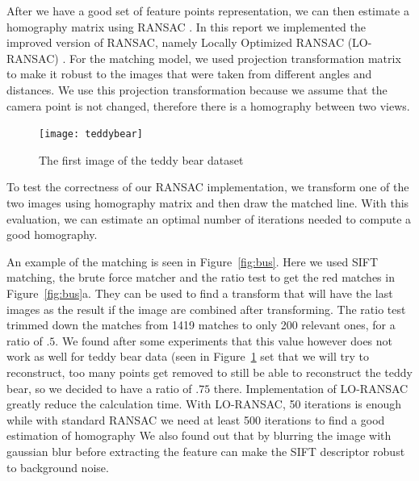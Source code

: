 After we have a good set of feature points representation, we can then estimate a homography matrix using RANSAC \cite{RANSAC}. 
In this report we implemented the improved version of RANSAC, namely Locally Optimized RANSAC (LO-RANSAC) \cite{LORANSAC}.
For the matching model, we used projection transformation matrix to make it robust to the images that were taken from different angles and distances.
We use this projection transformation because we assume that the camera point is not changed, therefore there is a homography between two views.

\begin{figure}[ht]
	\centering
	\texttt{[image: teddybear]}
	\caption{The first image of the teddy bear dataset}
	\label{fig:bear}
\end{figure}

To test the correctness of our RANSAC implementation, we transform one of the two images using homography matrix and then draw the matched line.
With this evaluation, we can estimate an optimal number of iterations needed to compute a good homography.


An example of the matching is seen in Figure~\ref{fig:bus}. 
Here we used SIFT matching, the brute force matcher and the ratio test to get the red matches in Figure~\ref{fig:bus}a. 
They can be used to find a transform that will have the last images as the result if the image are combined after transforming.
The ratio test trimmed down the matches from 1419 matches to only 200 relevant ones, for a ratio of $.5$.
We found after some experiments that this value however does not work as well for teddy bear data (seen in Figure~\ref{fig:bear} set that we will try to reconstruct,
too many points get removed to still be able to reconstruct the teddy bear,
so we decided to have a ratio of $.75$ there.
Implementation of LO-RANSAC greatly reduce the calculation time.
With LO-RANSAC, 50 iterations is enough while with standard RANSAC we need at least 500 iterations to find a good estimation of homography
We also found out that by blurring the image with gaussian blur before extracting the feature can make the SIFT descriptor robust to background noise.